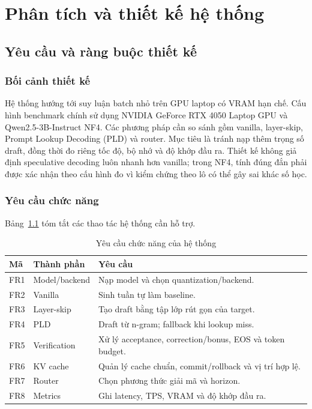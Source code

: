 \chapter{Phân tích và thiết kế hệ thống}

\section{Yêu cầu và ràng buộc thiết kế}
\subsection*{Bối cảnh thiết kế}
Hệ thống hướng tới suy luận batch nhỏ trên GPU laptop có VRAM hạn chế. Cấu hình benchmark chính sử dụng NVIDIA GeForce RTX 4050 Laptop GPU và Qwen2.5-3B-Instruct NF4. Các phương pháp cần so sánh gồm vanilla, layer-skip, Prompt Lookup Decoding (PLD) và router. Mục tiêu là tránh nạp thêm trọng số draft, đồng thời đo riêng tốc độ, bộ nhớ và độ khớp đầu ra. Thiết kế không giả định speculative decoding luôn nhanh hơn vanilla; trong NF4, tính đúng đắn phải được xác nhận theo cấu hình đo vì kiểm chứng theo lô có thể gây sai khác số học.

\subsection{Yêu cầu chức năng}
Bảng~\ref{tab:design-functional} tóm tắt các thao tác hệ thống cần hỗ trợ.
\begin{table}[H]
\centering
\caption{Yêu cầu chức năng của hệ thống}\label{tab:design-functional}
\begin{tabularx}{\textwidth}{@{}p{0.9cm}p{3.0cm}X@{}}
\toprule
\textbf{Mã} & \textbf{Thành phần} & \textbf{Yêu cầu} \\
\midrule
FR1 & Model/backend & Nạp model và chọn quantization/backend. \\
FR2 & Vanilla & Sinh tuần tự làm baseline. \\
FR3 & Layer-skip & Tạo draft bằng tập lớp rút gọn của target. \\
FR4 & PLD & Draft từ n-gram; fallback khi lookup miss. \\
FR5 & Verification & Xử lý acceptance, correction/bonus, EOS và token budget. \\
FR6 & KV cache & Quản lý cache chuẩn, commit/rollback và vị trí hợp lệ. \\
FR7 & Router & Chọn phương thức giải mã và horizon. \\
FR8 & Metrics & Ghi latency, TPS, VRAM và độ khớp đầu ra. \\
\bottomrule
\end{tabularx}
\end{table}

